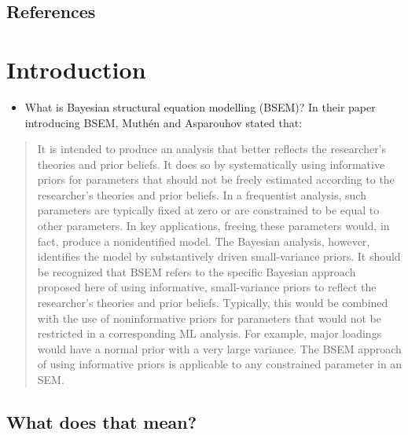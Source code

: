 \documentclass[]{book}
\providecommand{\tightlist}{%
  \setlength{\itemsep}{0pt}\setlength{\parskip}{0pt}}
\begin{document}
\hypertarget{references}{%
\section{References}\label{references}}

\hypertarget{introduction-1}{%
\chapter{Introduction}\label{introduction-1}}

\begin{itemize}
\tightlist
\item
  What is Bayesian structural equation modelling (BSEM)? In their paper introducing BSEM, Muthén and Asparouhov \citeyearpar[p 316]{Muthen2012} stated that:
\end{itemize}

\begin{quote}
It is intended to produce an analysis that better reflects the researcher's theories and prior beliefs. It does so by systematically using informative priors for parameters that should not be freely estimated according to the researcher's theories and prior beliefs. In a frequentist analysis, such parameters are typically fixed at zero or are constrained to be equal to other parameters. In key applications, freeing these parameters would, in fact, produce a nonidentified model. The Bayesian analysis, however, identifies the model by substantively driven small-variance priors. It should be recognized that BSEM refers to the specific Bayesian approach proposed here of using informative, small-variance priors to reflect the researcher's theories and prior beliefs. Typically, this would be combined with the use of noninformative priors for parameters that would not be restricted in a corresponding ML analysis. For example, major loadings would have a normal prior with a very large variance. The BSEM approach of using informative priors is applicable to any constrained parameter in an SEM.
\end{quote}

\hypertarget{what-does-that-mean}{%
\section{What does that mean?}\label{what-does-that-mean}}
\end{document}
